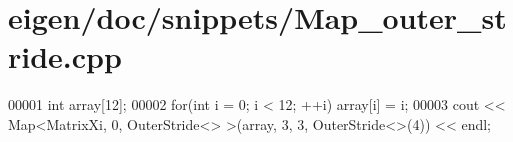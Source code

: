 \hypertarget{eigen_2doc_2snippets_2_map__outer__stride_8cpp_source}{}\section{eigen/doc/snippets/\+Map\+\_\+outer\+\_\+stride.cpp}
\label{eigen_2doc_2snippets_2_map__outer__stride_8cpp_source}

\begin{DoxyCode}
00001 \textcolor{keywordtype}{int} array[12];
00002 \textcolor{keywordflow}{for}(\textcolor{keywordtype}{int} i = 0; i < 12; ++i) array[i] = i;
00003 cout << Map<MatrixXi, 0, OuterStride<> >(array, 3, 3, OuterStride<>(4)) << endl;
\end{DoxyCode}
